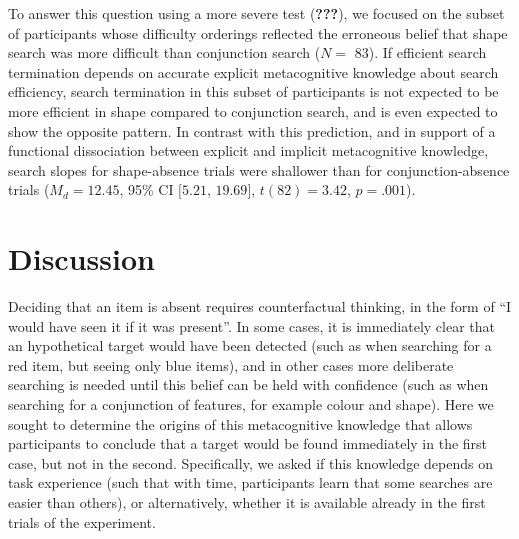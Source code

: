 \documentclass[
  english,
  man]{apa6}
\begin{document}
To answer this question using a more severe test ({\textbf{???}}), we focused on the subset of participants whose difficulty orderings reflected the erroneous belief that shape search was more difficult than conjunction search (\(N=\) 83). If efficient search termination depends on accurate explicit metacognitive knowledge about search efficiency, search termination in this subset of participants is not expected to be more efficient in shape compared to conjunction search, and is even expected to show the opposite pattern. In contrast with this prediction, and in support of a functional dissociation between explicit and implicit metacognitive knowledge, search slopes for shape-absence trials were shallower than for conjunction-absence trials (\(M_d = 12.45\), 95\% CI \([5.21\), \(19.69]\), \(t(82) = 3.42\), \(p = .001\)).

\hypertarget{discussion}{%
\section{Discussion}\label{discussion}}

Deciding that an item is absent requires counterfactual thinking, in the form of \enquote{I would have seen it if it was present}. In some cases, it is immediately clear that an hypothetical target would have been detected (such as when searching for a red item, but seeing only blue items), and in other cases more deliberate searching is needed until this belief can be held with confidence (such as when searching for a conjunction of features, for example colour and shape). Here we sought to determine the origins of this metacognitive knowledge that allows participants to conclude that a target would be found immediately in the first case, but not in the second. Specifically, we asked if this knowledge depends on task experience (such that with time, participants learn that some searches are easier than others), or alternatively, whether it is available already in the first trials of the experiment.
\end{document}
